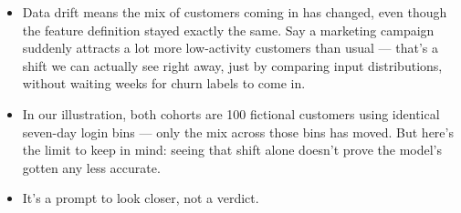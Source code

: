 \documentclass[11pt,a4paper]{article}
\begin{document}
\begin{examplebox}[title after break={SPOKEN SCRIPT --- slide 18 continued}]
\begin{itemize}
\item Data drift means the mix of customers coming in has changed, even though the feature definition stayed exactly the same. Say a marketing campaign suddenly attracts a lot more low-activity customers than usual — that's a shift we can actually see right away, just by comparing input distributions, without waiting weeks for churn labels to come in.
\item In our illustration, both cohorts are 100 fictional customers using identical seven-day login bins — only the mix across those bins has moved. But here's the limit to keep in mind: seeing that shift alone doesn't prove the model's gotten any less accurate.
\item It's a prompt to look closer, not a verdict.
\end{itemize}
\end{examplebox}
\par\noindent{\scriptsize\textcolor{teal!60!black}{Reading anchor: Bass, Ch. 11 / §14.1.5 · Invented counts}}
\clearpage
\end{document}
